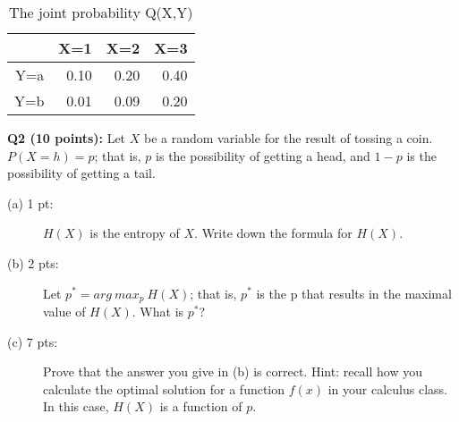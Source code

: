\documentclass[11pt]{article}
\begin{document}
\begin{table}[btph]
\centering
\caption{The joint probability Q(X,Y)}
\label{q1-table2}
\begin{tabular}{|r|r|r|r|}  \hline
    & X=1 & X=2 & X=3 \\ \hline
Y=a & 0.10 & 0.20 &  0.40 \\ \hline 
Y=b & 0.01 & 0.09 &  0.20 \\ \hline
\end{tabular}
\end{table}


\vspace{0.3 in}
\hspace{-0.3in}
{\bf Q2 (10 points):} Let $X$ be a random variable for the result of 
  tossing a coin. $P(X=h)=p$; that is, $p$ is the possibility of getting 
  a head, and $1-p$ is the possibility of getting a tail. 
\begin{description}
  \item [(a) 1 pt:] $H(X)$ is the entropy of $X$. Write down the formula for $H(X)$.
  \item [(b) 2 pts:] Let $p^* = arg \ max_{p} \ H(X)$; that is, $p^*$ is the p 
               that results in the maximal value of $H(X)$. What is $p^*$?

  \item [(c) 7 pts:] Prove that the answer you give in (b) is correct.
               Hint: recall how you calculate the optimal solution for 
                   a function $f(x)$ in your calculus class.
                   In this case, $H(X)$ is a function of $p$.
\end{description}
\end{document}
